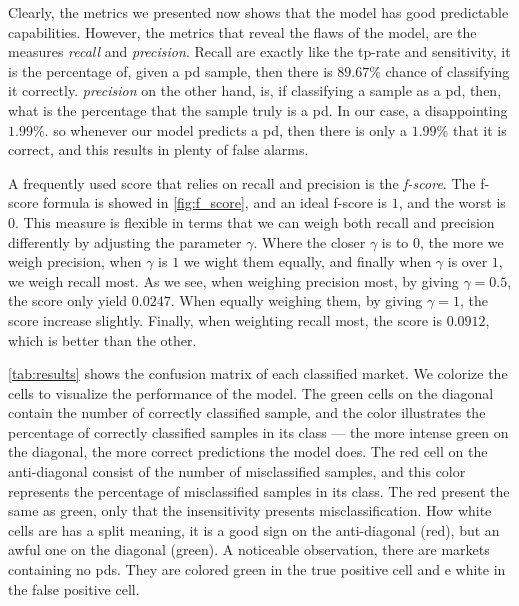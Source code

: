 Clearly, the metrics we presented now shows that the model has good predictable capabilities. However, the metrics that reveal the flaws of the model, are the measures \emph{recall} and \emph{precision}. Recall are exactly like the tp-rate and sensitivity, it is the percentage of, given a \ac{pd} sample, then there is $89.67\%$ chance of classifying it correctly. \emph{precision} on the other hand, is, if classifying a sample as a \ac{pd}, then, what is the percentage that the sample truly is a \ac{pd}. In our case, a disappointing $1.99\%$. so whenever our model predicts a \ac{pd}, then there is only a $1.99\%$ that it is correct, and this results in plenty of false alarms.



A frequently used score that relies on recall and precision is the \emph{f-score}. The f-score formula is showed in \autoref{fig:f_score}, and an ideal f-score is $1$, and the worst is $0$. This measure is flexible in terms that we can weigh both recall and precision differently by adjusting the parameter $\gamma$. Where the closer $\gamma$ is to $0$, the more we weigh precision, when $\gamma$ is $1$ we wight them equally, and finally when $\gamma$ is over $1$, we weigh recall most. As we see, when weighing precision most, by giving  $\gamma=0.5$, the score only yield $0.0247$. When equally weighing them, by giving $\gamma=1$, the score increase slightly. Finally, when weighting recall most, the score is $0.0912$, which is better than the other.

\autoref{tab:results} shows the confusion matrix of each classified market. We colorize the cells to visualize the performance of the model. The green cells on the diagonal contain the number of correctly classified sample, and the color illustrates the percentage of correctly classified samples in its class — the more intense green on the diagonal, the more correct predictions the model does. The red cell on the anti-diagonal consist of the number of misclassified samples, and this color represents the percentage of misclassified samples in its class. The red present the same as green, only that the insensitivity presents misclassification. How white cells are has a split meaning, it is a good sign on the anti-diagonal (red), but an awful one on the diagonal (green). A noticeable observation, there are markets containing no \acp{pd}. They are colored green in the true positive cell and e white in the false positive cell.



